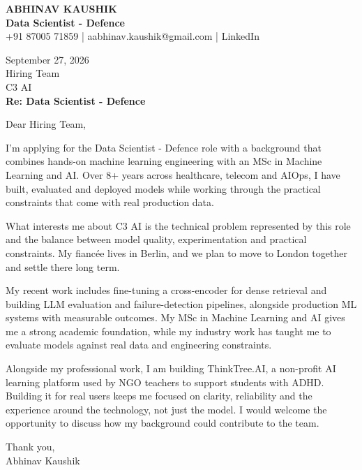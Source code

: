 \documentclass[10pt,a4paper]{article}
\begin{document}
\begin{center}
{\Large\bfseries ABHINAV KAUSHIK}\\[2pt]
{\bfseries Data Scientist - Defence}\\[2pt]
+91 87005 71859 \quad | \quad aabhinav.kaushik@gmail.com \quad | \quad LinkedIn
\end{center}
\vspace{8pt}
September 27, 2026\\[6pt]
Hiring Team\\
C3 AI\\[4pt]
\textbf{Re: Data Scientist - Defence}

Dear Hiring Team,

I’m applying for the Data Scientist - Defence role with a background that combines hands-on machine learning engineering with an MSc in Machine Learning and AI. Over 8+ years across healthcare, telecom and AIOps, I have built, evaluated and deployed models while working through the practical constraints that come with real production data.

What interests me about C3 AI is the technical problem represented by this role and the balance between model quality, experimentation and practical constraints. My fiancée lives in Berlin, and we plan to move to London together and settle there long term.

My recent work includes fine-tuning a cross-encoder for dense retrieval and building LLM evaluation and failure-detection pipelines, alongside production ML systems with measurable outcomes. My MSc in Machine Learning and AI gives me a strong academic foundation, while my industry work has taught me to evaluate models against real data and engineering constraints.

Alongside my professional work, I am building ThinkTree.AI, a non-profit AI learning platform used by NGO teachers to support students with ADHD. Building it for real users keeps me focused on clarity, reliability and the experience around the technology, not just the model. I would welcome the opportunity to discuss how my background could contribute to the team.

Thank you,\\
Abhinav Kaushik
\end{document}
